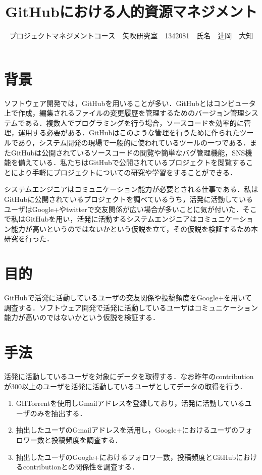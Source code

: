 \documentclass[uplatex,twocolumn,dvipdfmx]{jsarticle}
\title{\vspace{-5mm}\fontsize{14pt}{0pt}\selectfont GitHubにおける人的資源マネジメント}
\author{\normalsize プロジェクトマネジメントコース　矢吹研究室　1342081　氏名　辻岡　大知}
\date{}
\begin{document}
\fontsize{10.5pt}{\baselineskip}\selectfont
\maketitle





\section{背景}

ソフトウェア開発では，GitHubを用いることが多い．GitHubとはコンピュータ上で作成，編集されるファイルの変更履歴を管理するためのバージョン管理システムである．複数人でプログラミングを行う場合，ソースコードを効率的に管理，運用する必要がある．GitHubはこのような管理を行うために作られたツールであり，システム開発の現場で一般的に使われているツールの一つである\cite{a}．またGitHubは公開されているソースコードの閲覧や簡単なバグ管理機能，SNS機能を備えている．私たちはGitHubで公開されているプロジェクトを閲覧することにより手軽にプロジェクトについての研究や学習をすることができる．

システムエンジニアはコミュニケーション能力が必要とされる仕事である．私はGitHubに公開されているプロジェクトを調べているうち，活発に活動しているユーザはGoogle+やtwitterで交友関係が広い場合が多いことに気が付いた．そこで私はGitHubを用い，活発に活動するシステムエンジニアはコミュニケーション能力が高いというのではないかという仮説を立て，その仮説を検証するため本研究を行った．


\section{目的}

GitHubで活発に活動しているユーザの交友関係や投稿頻度をGoogle+を用いて調査する．ソフトウェア開発で活発に活動しているユーザはコミュニケーション能力が高いのではないかという仮説を検証する．

\section{手法}

活発に活動しているユーザを対象にデータを取得する．なお昨年のcontributionが300以上のユーザを活発に活動しているユーザとしてデータの取得を行う．

\begin{enumerate}
 \item GHTorrent\cite{GHTorrent}を使用しGmailアドレスを登録しており，活発に活動しているユーザのみを抽出する．
 \item 抽出したユーザのGmailアドレスを活用し，Google+におけるユーザのフォロワー数と投稿頻度を調査する．
 \item 抽出したユーザのGoogle+におけるフォロワー数，投稿頻度とGitHubにおけるcontributionとの関係性を調査する．
\end{enumerate}
\end{document}
